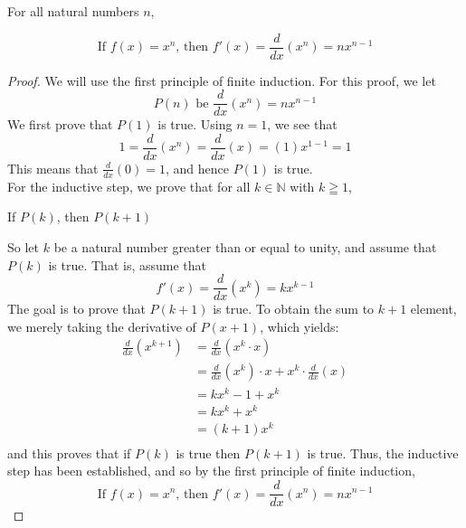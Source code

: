 \newpage
\begin{example}

For all natural numbers $n$,
\begin{tcolorbox}
    \begin{theorem}
        \begin{equation*}
            \text{If } f(x) = x^n \text{, then } f'(x) = \frac{d}{dx}(x^n) = nx^{n-1}
        \end{equation*}  
    \end{theorem}
\end{tcolorbox}

 \begin{proof}
        We will use the first principle of finite induction. For this proof, we let
            \begin{equation*}
                P(n) \text{ be } \frac{d}{dx}(x^n) = nx^{n-1}
            \end{equation*}
        We first prove that $P(1)$ is true. Using $n=1$, we see that
            \begin{equation*}
                1 = \frac{d}{dx}(x^n) = \frac{d}{dx}(x) = (1)x^{1-1} = 1
            \end{equation*}
        This means that $ \frac{d}{dx}(0) = 1$, and hence $P(1)$ is true. \\
        For the inductive step, we prove that for all $k \in \mathbb{N}$ with $k \geqq 1$, 
            \begin{center}
                If $P(k)$, then $P(k+1)$
            \end{center}
        So let $k$ be a natural number greater than or equal to unity, and assume that $P(k)$ is true. That is, assume that 
            \begin{equation*}
                f'(x) = \frac{d}{dx}(x^k) = kx^{k-1}
            \end{equation*}
        The goal is to prove that $P(k+1)$ is true. To obtain the sum to $k+1$ element, we merely taking the derivative of $P(x+1)$, which yields:
            \begin{align*}
                \frac{d}{dx}(x^{k+1}) & = \frac{d}{dx}(x^k \cdot x) \\
                    & = \frac{d}{dx}(x^k) \cdot x + x^k \cdot \frac{d}{dx}(x) \\
                    & = kx^k-1 + x^k \\
                    & = kx^k + x^k \\
                    & = (k + 1)x^k \\
            \end{align*}
        and this proves that if $P(k)$ is true then $P(k+1)$ is true. Thus, the inductive step has been established, and so by the first principle of finite induction,
            \begin{equation*}
                \text{If } f(x) = x^n \text{, then } f'(x) = \frac{d}{dx}(x^n) = nx^{n-1}
            \end{equation*}
    \end{proof}
\end{example}



